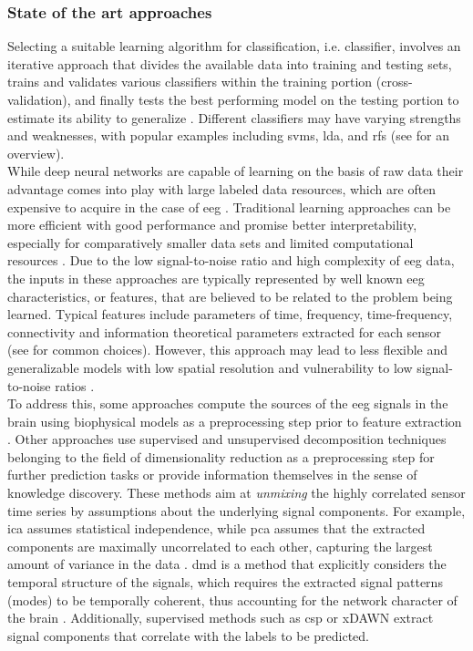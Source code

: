\subsubsection{State of the art approaches}
Selecting a suitable learning algorithm for classification, i.e. classifier, involves an iterative approach that divides the available data into training and testing sets, trains and validates various classifiers within the training portion (cross-validation), and finally tests the best performing model on the testing portion to estimate its ability to generalize \cite{Hastie2009}. Different classifiers may have varying strengths and weaknesses, with popular examples including \glspl{svm}, \gls{lda}, and \glspl{rf} (see \cite{shoorangiz2021eeg} for an overview).\\
While deep neural networks are capable of learning on the basis of raw data their advantage comes into play with large labeled data resources, which are often expensive to acquire in the case of \gls{eeg} \cite{Banville2021}. Traditional learning approaches can be more efficient with good performance and promise better interpretability, especially for comparatively smaller data sets and limited computational resources \cite{Gemein2020}. Due to the low signal-to-noise ratio and high complexity of \gls{eeg} data, the inputs in these approaches are typically represented by well known \gls{eeg} characteristics, or features, that are believed to be related to the problem being learned. Typical features include parameters of time, frequency, time-frequency, connectivity and information theoretical parameters extracted for each sensor (see \cite{Gemein2020} for common choices). However, this approach may lead to less flexible and generalizable models with low spatial resolution and vulnerability to low signal-to-noise ratios \cite{Saeidi2021}.\\
To address this, some approaches compute the sources of the \gls{eeg} signals in the brain using biophysical models as a preprocessing step prior to feature extraction \cite{Khan2018, Westner2018}. Other approaches use supervised and unsupervised decomposition techniques belonging to the field of dimensionality reduction as a preprocessing step for further prediction tasks or provide information themselves in the sense of knowledge discovery. These methods aim at \textit{unmixing} the highly correlated sensor time series by assumptions about the underlying signal components. For example, \gls{ica} assumes statistical independence, while \gls{pca} assumes that the extracted components are maximally uncorrelated to each other, capturing the largest amount of variance in the data \cite{CohenX2017}. \Gls{dmd} is a method that explicitly considers the temporal structure of the signals, which requires the extracted signal patterns (modes) to be temporally coherent, thus accounting for the network character of the brain \cite{Brunton2016}. Additionally, supervised methods such as \gls{csp} \cite{Blankertz2008} or xDAWN \cite{rivet2009xdawn} extract signal components that correlate with the labels to be predicted.\\
